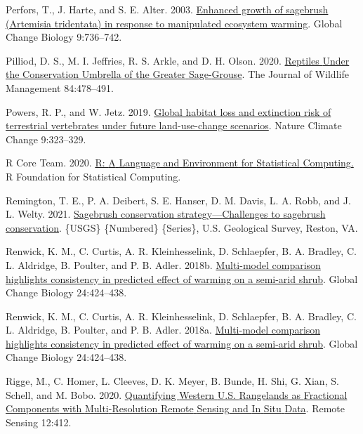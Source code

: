 \documentclass[
  12pt,
]{article}
\newlength{\cslhangindent}
\newlength{\cslentryspacingunit} %
\newenvironment{CSLReferences}[2] %
 {%
  \setlength{\parindent}{0pt}
  \ifodd #1
  \let\oldpar\par
  \def\par{\hangindent=\cslhangindent\oldpar}
  \fi
  \setlength{\parskip}{#2\cslentryspacingunit}
 }%
 {}
\begin{document}
\begin{CSLReferences}{1}{0}
\leavevmode{}%
Perfors, T., J. Harte, and S. E. Alter. 2003. \href{https://doi.org/10.1046/j.1365-2486.2003.00559.x}{Enhanced growth of sagebrush ({Artemisia} tridentata) in response to manipulated ecosystem warming}. Global Change Biology 9:736--742.

\leavevmode{}%
Pilliod, D. S., M. I. Jeffries, R. S. Arkle, and D. H. Olson. 2020. \href{https://doi.org/10.1002/jwmg.21821}{Reptiles {Under} the {Conservation} {Umbrella} of the {Greater} {Sage}-{Grouse}}. The Journal of Wildlife Management 84:478--491.

\leavevmode{}%
Powers, R. P., and W. Jetz. 2019. \href{https://doi.org/10.1038/s41558-019-0406-z}{Global habitat loss and extinction risk of terrestrial vertebrates under future land-use-change scenarios}. Nature Climate Change 9:323--329.

\leavevmode{}%
R Core Team. 2020. \href{https://www.R-project.org/}{R: {A} {Language} and {Environment} for {Statistical} {Computing}.} R Foundation for Statistical Computing.

\leavevmode{}%
Remington, T. E., P. A. Deibert, S. E. Hanser, D. M. Davis, L. A. Robb, and J. L. Welty. 2021. \href{https://doi.org/10.3133/ofr20201125}{Sagebrush conservation strategy---{Challenges} to sagebrush conservation}. \{USGS\} \{Numbered\} \{Series\}, U.S. Geological Survey, Reston, VA.

\leavevmode{}%
Renwick, K. M., C. Curtis, A. R. Kleinhesselink, D. Schlaepfer, B. A. Bradley, C. L. Aldridge, B. Poulter, and P. B. Adler. 2018b. \href{https://doi.org/10.1111/gcb.13900}{Multi-model comparison highlights consistency in predicted effect of warming on a semi-arid shrub}. Global Change Biology 24:424--438.

\leavevmode{}%
Renwick, K. M., C. Curtis, A. R. Kleinhesselink, D. Schlaepfer, B. A. Bradley, C. L. Aldridge, B. Poulter, and P. B. Adler. 2018a. \href{https://doi.org/10.1111/gcb.13900}{Multi-model comparison highlights consistency in predicted effect of warming on a semi-arid shrub}. Global Change Biology 24:424--438.

\leavevmode{}%
Rigge, M., C. Homer, L. Cleeves, D. K. Meyer, B. Bunde, H. Shi, G. Xian, S. Schell, and M. Bobo. 2020. \href{https://doi.org/10.3390/rs12030412}{Quantifying {Western} {U}.{S}. {Rangelands} as {Fractional} {Components} with {Multi}-{Resolution} {Remote} {Sensing} and {In} {Situ} {Data}}. Remote Sensing 12:412.


\end{CSLReferences}
\end{document}
